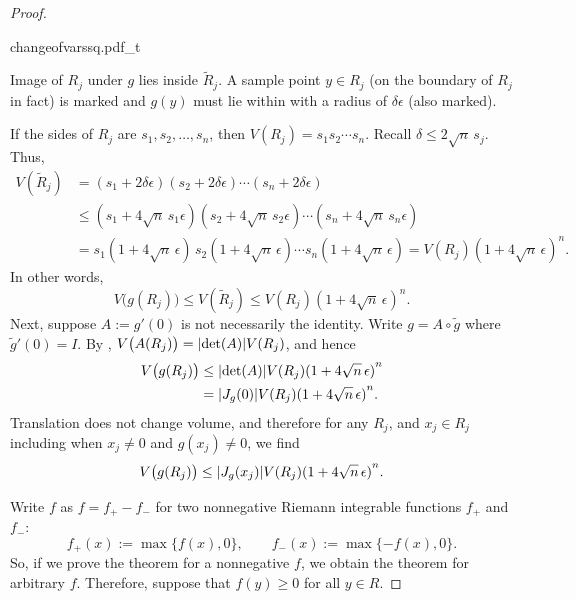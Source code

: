 \begin{proof}
\begin{myfigureht}
{changeofvarssq.pdf_t}
\caption{Image of $R_j$ under $g$ lies inside
$\widetilde{R}_j$.  A sample point $y \in R_j$ (on the boundary of $R_j$ in fact) is marked
and $g(y)$ must lie within with a radius of $\delta\epsilon$
(also marked).\label{changeofvarssq:fig}}
\end{myfigureht}


If the sides of $R_j$ are $s_1,s_2,\ldots,s_n$, then
$V(R_j) = s_1 s_2 \cdots s_n$.   Recall $\delta \leq 2\sqrt{n} \, s_j$.
Thus,
\begin{equation*}
\begin{split}
V(\widetilde{R}_j) & =
(s_1+2\delta \epsilon )
(s_2+2\delta \epsilon )
\cdots
(s_n+2\delta \epsilon )
\\
& \leq
(s_1+4 \sqrt{n}\,s_1 \epsilon )
(s_2+4 \sqrt{n}\,s_2 \epsilon )
\cdots
(s_n+4 \sqrt{n}\,s_n \epsilon )
\\
& =
s_1 (1+4 \sqrt{n}\, \epsilon )
\,
s_2 (1+4 \sqrt{n}\, \epsilon )
\cdots
s_n (1+4 \sqrt{n}\, \epsilon )
=
V(R_j) {(1+4\sqrt{n} \, \epsilon)}^n .
\end{split}
\end{equation*}
In other words,
\begin{equation*}
V\bigl(g(R_j)\bigr) \leq V(\widetilde{R}_j) \leq V(R_j) {(1+4\sqrt{n} \, \epsilon)}^n .
\end{equation*}
Next, suppose $A := g'(0)$ is not necessarily the identity.
Write $g = A \circ \widetilde{g}$ where $\widetilde{g}'(0) = I$.
By ,
$V\bigl(A(R_j)\bigr) = \lvert {\det(A)} \rvert V(R_j)$, and hence
\begin{equation*}
\begin{split}
V\bigl(g(R_j)\bigr) & \leq
\lvert {\det(A)} \rvert V(R_j) {(1+4\sqrt{n} \, \epsilon)}^n \\
& =
\lvert {J_g(0)} \rvert V(R_j) {(1+4\sqrt{n} \, \epsilon)}^n .
\end{split}
\end{equation*}
Translation does not change volume, and therefore
for any $R_j$, and $x_j \in R_j$ including when $x_j \not= 0$ and $g(x_j)
\not= 0$, we find
\begin{equation*}
V\bigl(g(R_j)\bigr) \leq
\lvert {J_g(x_j)} \rvert V(R_j) {(1+4\sqrt{n} \, \epsilon)}^n .
\end{equation*}

Write $f$ as
$f = f_+ - f_-$ for two nonnegative Riemann integrable
functions $f_+$ and $f_-$:
\begin{equation*}
f_+(x) := \max \{ f(x) , 0 \}, \qquad
f_-(x) := \max \{ -f(x) , 0 \} .
\end{equation*}
So, if we prove the theorem for a nonnegative $f$,
we obtain the theorem for arbitrary $f$.
Therefore, suppose that 
$f(y) \geq 0$ for all $y \in R$.


\end{proof}
